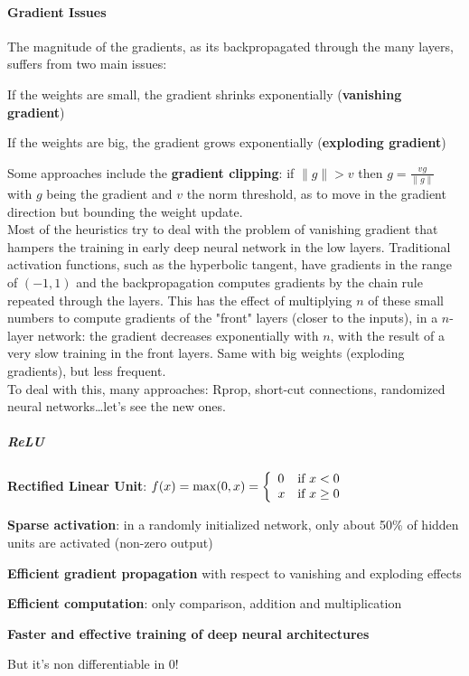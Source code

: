 \documentclass[10pt]{report}
\begin{document}
\paragraph{Gradient Issues} The magnitude of the gradients, as its backpropagated through the many layers, suffers from two main issues:
\begin{list}{}{}
	\item If the weights are small, the gradient shrinks exponentially (\textbf{vanishing gradient})
	\item If the weights are big, the gradient grows exponentially (\textbf{exploding gradient})
\end{list}
Some approaches include the \textbf{gradient clipping}: if $\|g\|> v$ then $g = \frac{vg}{\|g\|}$ with $g$ being the gradient and $v$ the norm threshold, as to move in the gradient direction but bounding the weight update.\\
Most of the heuristics try to deal with the problem of vanishing gradient that hampers the training in early deep neural network in the low layers. Traditional activation functions, such as the hyperbolic tangent, have gradients in the range of $(-1,1)$ and the backpropagation computes gradients by the chain rule repeated through the layers. This has the effect of multiplying $n$ of these small numbers to compute gradients of the "front" layers (closer to the inputs), in a $n$-layer network: the gradient decreases exponentially with $n$, with the result of a very slow training in the front layers. Same with big weights (exploding gradients), but less frequent.\\
To deal with this, many approaches: Rprop, short-cut connections, randomized neural networks\ldots let's see the new ones.
\subparagraph{ReLU} \textbf{Rectified Linear Unit}: $f(x) = \max(0,x) = \left\{\begin{array}{l l}
0&\text{if }x< 0\\
x&\text{if }x\geq 0\\
\end{array}\right.$
\begin{list}{}{}
	\item \textbf{Sparse activation}: in a randomly initialized network, only about 50\% of hidden units are activated (non-zero output)
	\item \textbf{Efficient gradient propagation} with respect to vanishing and exploding effects
	\item \textbf{Efficient computation}: only comparison, addition and multiplication
	\item \textbf{Faster and effective training of deep neural architectures}
	\item But it's non differentiable in 0!
\end{list}
\end{document}
